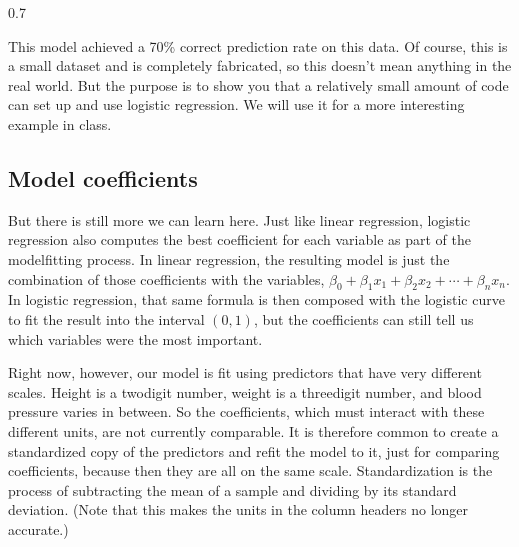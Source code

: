 \documentclass[letterpaper,10pt,english]{sphinxmanual}
\begin{document}
\begin{sphinxVerbatim}[commandchars=\\\{\}]
0.7
\end{sphinxVerbatim}

This model achieved a 70\% correct prediction rate on this data.  Of course, this is a small dataset and is completely fabricated, so this doesn’t mean anything in the real world.  But the purpose is to show you that a relatively small amount of code can set up and use logistic regression.  We will use it for a more interesting example in class.


\subsection{Model coefficients}
\label{\detokenize{chapter-17-machine-learning:model-coefficients}}
But there is still more we can learn here.  Just like linear regression, logistic regression also computes the best coefficient for each variable as part of the model\sphinxhyphen{}fitting process.  In linear regression, the resulting model is just the combination of those coefficients with the variables, \(\beta_0+\beta_1x_1+\beta_2x_2+\cdots+\beta_nx_n\).  In logistic regression, that same formula is then composed with the logistic curve to fit the result into the interval \((0,1)\), but the coefficients can still tell us which variables were the most important.

Right now, however, our model is fit using predictors that have very different scales.  Height is a two\sphinxhyphen{}digit number, weight is a three\sphinxhyphen{}digit number, and blood pressure varies in between.  So the coefficients, which must interact with these different units, are not currently comparable.  It is therefore common to create a standardized copy of the predictors and re\sphinxhyphen{}fit the model to it, just for comparing coefficients, because then they are all on the same scale.  Standardization is the process of subtracting the mean of a sample and dividing by its standard deviation.  (Note that this makes the units in the column headers no longer accurate.)

\begin{sphinxVerbatim}[commandchars=\\\{\}]
        
\end{sphinxVerbatim}
\end{document}

